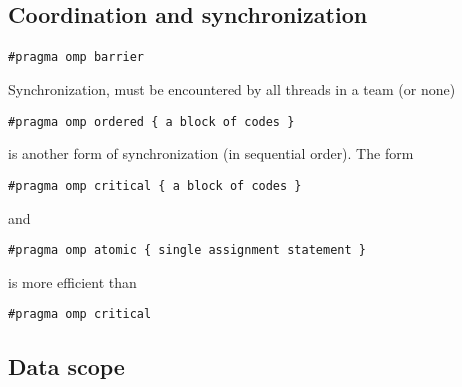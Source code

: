 \subsection*{Coordination and synchronization}

\paragraph{}


\begin{verbatim}
#pragma omp barrier

\end{verbatim}

Synchronization, must be encountered by all threads in a team (or none)


\begin{verbatim}
#pragma omp ordered { a block of codes }

\end{verbatim}

is another form of synchronization (in sequential order).
The form


\begin{verbatim}
#pragma omp critical { a block of codes }

\end{verbatim}

and 


\begin{verbatim}
#pragma omp atomic { single assignment statement }

\end{verbatim}

is  more efficient than 


\begin{verbatim}
#pragma omp critical

\end{verbatim}



\subsection*{Data scope}

